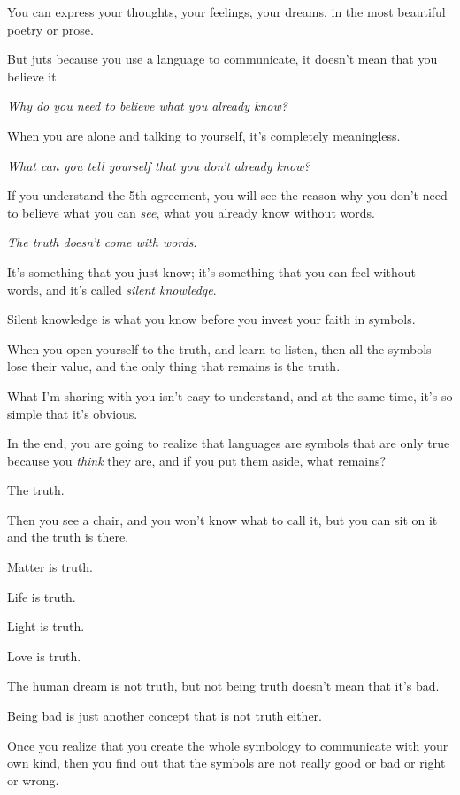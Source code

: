 \documentclass{article}
\numberwithin{equation}{section}
\begin{document}
You can express your thoughts, your feelings, your dreams, in the most beautiful poetry or prose.

But juts because you use a language to communicate, it doesn't mean that you believe it.

\textit{Why do you need to believe what you already know?}

When you are alone and talking to yourself, it's completely meaningless.

\textit{What can you tell yourself that you don't already know?}

%
If you understand the 5th agreement, you will see the reason why you don't need to believe what you can \textit{see}, what you already know without words.

\textit{The truth doesn't come with words}.


It's something that you just know; it's something that you can feel without words, and it's called \textit{silent knowledge}.

Silent knowledge is what you know before you invest your faith in symbols.

When you open yourself to the truth, and learn to listen, then all the symbols lose their value, and the only thing that remains is the truth.


%
What I'm sharing with you isn't easy to understand, and at the same time, it's so simple that it's obvious.

In the end, you are going to realize that languages are symbols that are only true because you \textit{think} they are, and if you put them aside, what remains?

The truth.

Then you see a chair, and you won't know what to call it, but you can sit on it and the truth is there.

Matter is truth.

Life is truth.

Light is truth.

Love is truth.

The human dream is not truth, but not being truth doesn't mean that it's bad.

Being bad is just another concept that is not truth either.

%
Once you realize that you create the whole symbology to communicate with your own kind, then you find out that the symbols are not really good or bad or right or wrong.
\end{document}
